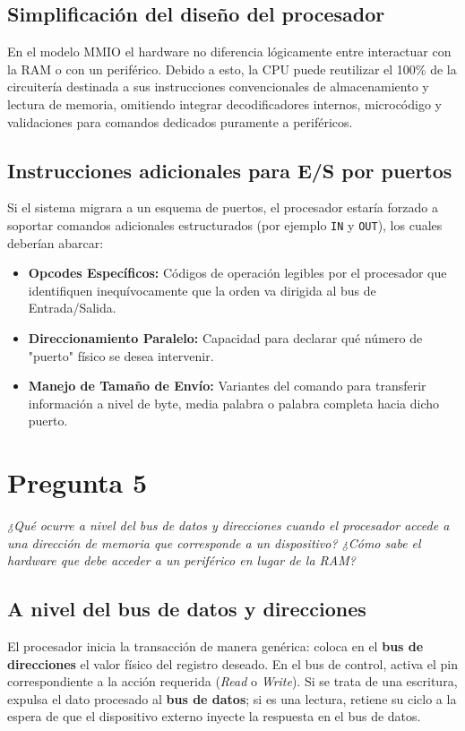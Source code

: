\documentclass[12pt,a4paper]{article}
\begin{document}
	\subsection{Simplificación del diseño del procesador}
	En el modelo MMIO el hardware no diferencia lógicamente entre interactuar con la RAM o con un periférico. Debido a esto, la CPU puede reutilizar el 100\% de la circuitería destinada a sus instrucciones convencionales de almacenamiento y lectura de memoria, omitiendo integrar decodificadores internos, microcódigo y validaciones para comandos dedicados puramente a periféricos.
	
	\subsection{Instrucciones adicionales para E/S por puertos}
	Si el sistema migrara a un esquema de puertos, el procesador estaría forzado a soportar comandos adicionales estructurados (por ejemplo \texttt{IN} y \texttt{OUT}), los cuales deberían abarcar:
	\begin{itemize}
		\item \textbf{Opcodes Específicos:} Códigos de operación legibles por el procesador que identifiquen inequívocamente que la orden va dirigida al bus de Entrada/Salida.
		\item \textbf{Direccionamiento Paralelo:} Capacidad para declarar qué número de "puerto" físico se desea intervenir.
		\item \textbf{Manejo de Tamaño de Envío:} Variantes del comando para transferir información a nivel de byte, media palabra o palabra completa hacia dicho puerto.
	\end{itemize}
	
	\section{Pregunta 5}
	\textit{¿Qué ocurre a nivel del bus de datos y direcciones cuando el procesador accede a una dirección de memoria que corresponde a un dispositivo? ¿Cómo sabe el hardware que debe acceder a un periférico en lugar de la RAM?}
	
	\subsection{A nivel del bus de datos y direcciones}
	El procesador inicia la transacción de manera genérica: coloca en el \textbf{bus de direcciones} el valor físico del registro deseado. En el bus de control, activa el pin correspondiente a la acción requerida (\textit{Read} o \textit{Write}). Si se trata de una escritura, expulsa el dato procesado al \textbf{bus de datos}; si es una lectura, retiene su ciclo a la espera de que el dispositivo externo inyecte la respuesta en el bus de datos.
	
\end{document}
